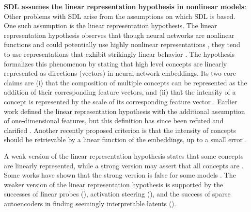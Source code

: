 \textbf{SDL assumes the linear representation hypothesis in nonlinear models}: Other problems with SDL arise from the assumptions on which SDL is based. One such assumption is the linear representation hypothesis. The linear representation hypothesis observes that though neural networks are nonlinear functions and could potentially use highly nonlinear representations \citep{black2022interpretingneuralnetworkspolytope,engels2024decomposingdarkmattersparse, kirch2024featurespromptsjailbreakllms}, they tend to use representations that exhibit strikingly linear behavior \citep{Smolensky_1986, mikolov-etal-2013-linguistic,olah2020zoom,elhage2021mathematical,park2024linearrepresentationhypothesisgeometry, guerner2024geometricnotioncausalprobing,gurnee2024languagemodelsrepresentspace}. The hypothesis formalizes this phenomenon by stating that high level concepts are linearly represented as directions (vectors) in neural network embeddings. Its two core claims are (i) that the composition of multiple concepts can be represented as the addition of their corresponding feature vectors, and (ii) that the intensity of a concept is represented by the scale of its corresponding feature vector \citep{olah2024linear}. Earlier work \citep{elhage2021mathematical} defined the linear representation hypothesis with the additional assumption of one-dimensional features, but this definition has since been refuted \citep{Yedidia_2023,chughtai2024understanding, engels2024languagemodelfeatureslinear} and clarified \citep{olah2024linear}. Another recently proposed criterion is that the intensity of concepts should be retrievable by a linear function of the embeddings, up to a small error \citep{hani2024mathematicalmodels, olah2024linear}.

A weak version of the linear representation hypothesis states that some concepts are linearly represented, while a strong version may assert that all concepts are \citep{Smith_2024_strongfeature}. Some works have shown that the strong version is false for some models \citep{black2022interpretingneuralnetworkspolytope, csordás2024recurrentneuralnetworkslearn}. The weaker version of the linear representation hypothesis is supported by the successes of linear probes (), activation steering (), and the success of sparse autoencoders in finding seemingly interpretable latents ().

